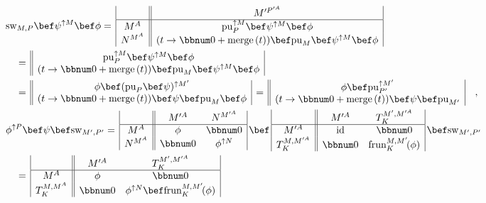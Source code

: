 \begin{align*}
 & \text{sw}_{M,P}\bef\psi^{\uparrow M}\bef\phi=\,\begin{array}{|c||c|}
 & M^{\prime P^{\prime A}}\\
\hline M^{A} & \text{pu}_{P}^{\uparrow M}\bef\psi^{\uparrow M}\bef\phi\\
N^{M^{A}} & (t\rightarrow\bbnum 0+\text{merge}\,(t))\bef\text{pu}_{M}\bef\psi^{\uparrow M}\bef\phi
\end{array}\\
 & \quad=\,\begin{array}{||c|}
\text{pu}_{P}^{\uparrow M}\bef\psi^{\uparrow M}\bef\phi\\
(t\rightarrow\bbnum 0+\text{merge}\,(t))\bef\text{pu}_{M}\bef\psi^{\uparrow M}\bef\phi
\end{array}\\
 & \quad=\,\begin{array}{||c|}
\phi\bef(\text{pu}_{P}\bef\psi)^{\uparrow M^{\prime}}\\
(t\rightarrow\bbnum 0+\text{merge}\,(t))\bef\psi\bef\text{pu}_{M}\bef\phi
\end{array}\,=\,\begin{array}{||c|}
\phi\bef\text{pu}_{P^{\prime}}^{\uparrow M^{\prime}}\\
(t\rightarrow\bbnum 0+\text{merge}\,(t))\bef\psi\bef\text{pu}_{M^{\prime}}
\end{array}\quad,\\
 & \phi^{\uparrow P}\bef\psi\bef\text{sw}_{M^{\prime},P^{\prime}}=\,\begin{array}{|c||cc|}
 & M^{\prime A} & N^{M^{\prime A}}\\
\hline M^{A} & \phi & \bbnum 0\\
N^{M^{A}} & \bbnum 0 & \phi^{\uparrow N}
\end{array}\,\bef\,\begin{array}{|c||cc|}
 & M^{\prime A} & T_{K}^{M^{\prime},M^{\prime A}}\\
\hline M^{\prime A} & \text{id} & \bbnum 0\\
T_{K}^{M,M^{\prime A}} & \bbnum 0 & \text{frun}_{K}^{M,M^{\prime}}\!(\phi)
\end{array}\,\bef\text{sw}_{M^{\prime},P^{\prime}}\\
 & \quad=\,\begin{array}{|c||cc|}
 & M^{\prime A} & T_{K}^{M^{\prime},M^{\prime A}}\\
\hline M^{A} & \phi & \bbnum 0\\
T_{K}^{M,M^{A}} & \bbnum 0 & \phi^{\uparrow N}\bef\text{frun}_{K}^{M,M^{\prime}}\!(\phi)

\end{array}
\end{align*}

